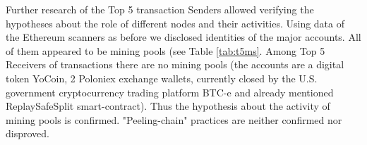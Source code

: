 Further research of the Top 5 transaction Senders allowed verifying the hypotheses about the role of different nodes and their activities.
Using data of the Ethereum scanners as before we disclosed identities of the major accounts. 
All of them appeared to be mining pools (see Table \ref{tab:t5ms}.
Among Top 5 Receivers of transactions there are no mining pools (the accounts are a digital token YoCoin, 2 Poloniex exchange wallets, currently closed by the U.S. government cryptocurrency trading platform BTC-e and already mentioned ReplaySafeSplit smart-contract).
Thus the hypothesis about the activity of mining pools is confirmed.
"Peeling-chain" practices are neither confirmed nor disproved.







